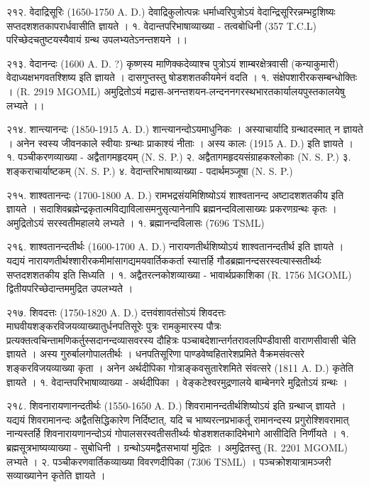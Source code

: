 २१२. वेदाद्रिसूरिः (1650-1750 A. D.)
देवाद्रिकुलोत्पन्नः धर्माध्वरिपुत्रोऽयं वेदान्द्रिसूरिरन्नम्भट्टशिष्यः सप्तदशशतकापरार्धवासीति ज्ञायते ।
१. वेदान्तपरिभाषाव्याख्या - तत्वबोधिनी (357 T.C.L) परिच्छेदचतुष्टयस्यैवायं ग्रन्थ उपलभ्यतेऽनन्तशयने ।।

२१३. वेदानन्दः (1600 A. D. ?)
कृष्णस्य माणिक्कदेव्याश्च पुत्रोऽयं शाम्बरक्षेत्रवासी (कन्याकुमारी) वेदाध्यक्षभगवतश्शिष्य इति ज्ञायते । दासगुप्तस्तु षोडशशतकीयमेनं वदति ।
१. संक्षेपशारीरकसम्बन्धोक्तिः । (R. 2919 MGOML)
अमुद्रितोऽयं मद्रास-अनन्तशयन-लन्दननगरस्थभारतकार्यालयपुस्तकालयेषु लभ्यते ।।

२१४. शान्त्यानन्दः (1850-1915 A. D.)
शान्त्यानन्दोऽयमाधुनिकः । अस्याचार्यादि ग्रन्थादस्मात् न ज्ञायते । अनेन स्वस्य जीवनकाले स्वीयाः ग्रन्थाः प्राकाश्यं नीताः । अस्य कालः (1915 A. D.) इति ज्ञायते ।
१. पञ्चीकरणव्याख्या - अद्वैतागमहृदयम् (N. S. P.)
२. अद्वैतागमहृदयसंग्राहकश्लोकाः (N. S. P.)
३. शङ्कराचार्याष्टकम् (N. S. P.)
४. वेदान्तरिभाषाव्याख्या - पदार्थमञ्जूषा (N. S. P.)

२१५. शाश्वतानन्दः (1700-1800 A. D.)
रामभद्रसंयमिशिष्योऽयं शाश्वतानन्द अष्टादशशतकीय इति ज्ञायते । सदाशिवब्रह्मेन्द्रकृतात्मविद्याविलासमनुसृत्यानेनापि ब्रह्मनन्दविलासाख्यः प्रकरणग्रन्थः कृतः । अमुद्रितोऽयं सरस्वतीमहालये लभ्यते ।
१. ब्रह्मानन्दविलासः (7696 TSML)

२१६. शाश्वतानन्दतीर्थः (1600-1700 A. D.)
नारायणतीर्थशिष्योऽयं शाश्वतानन्दतीर्थ इति ज्ञायते । यद्ययं नारायणतीर्थश्शारीरकमीमांसागद्यमयवार्तिककर्ता स्यात्तर्हि गौडब्रह्मानन्दसरस्वत्यास्सतीर्थ्यः सप्तदशशतकीय इति सिध्यति । 
१. अद्वैतरत्नकोशव्याख्या - भावार्थप्रकाशिका (R. 1756 MGOML) द्वितीयपरिच्छेदान्तममुद्रित उपलभ्यते ।

२१७. शिवदत्तः (1750-1820 A. D.)
दत्तवंशावतंसोऽयं शिवदत्तः माघवीयशङ्करविजयव्याख्यातुर्धनपतिसूरेः पुत्रः रामकुमारस्य पौत्रः प्रत्यक्तत्वचिन्तामणिकर्तुस्सदानन्दव्यासवरस्य दौहित्रः पञ्चाबदेशान्तर्गतरावलपिण्डीवासी वाराणसीवासी चेति ज्ञायते । अस्य गुरुर्बालगोपालतीर्थः । धनपतिसूरिणा पाण्डवेष्वहितारेशप्रमिते वैक्रमसंवत्सरे शङ्करविजयव्याख्या कृता । अनेन अर्थदीपिका गोत्राङ्कवसुतारेशमिते संवत्सरे (1811 A. D.) कृतेति ज्ञायते ।
१. वेदान्तपरिभाषाव्याख्या - अर्थदीपिका । वेङ्कटेश्वरमुद्रणालये बाम्बेनगरे मुद्रितोऽयं ग्रन्थः ।

२१८. शिवनारायणानन्दतीर्थः (1550-1650 A. D.)
शिवरामानन्दतीर्थशिष्योऽयं इति ग्रन्थाज् ज्ञायते । यद्ययं शिवरामानन्दः अद्वैतसिद्धिकारेण निर्दिष्टात्, यदि च भाष्यरत्नप्रभाकर्तू रामानन्दस्य प्रगुरोश्शिवरामात् नान्यस्तर्हि शिवनारायणानन्दोऽयं गोपालसरस्वतीसतीर्थ्यः षोडशशतकादिमेभागे आसीदिति निर्णीयते ।
१. ब्रह्मसूत्रभाष्यव्याख्या - सुबोधिनी । ग्रन्थोऽयमद्वैतसभायां मुद्रितः । अमुद्रितस्तु (R. 2201 MGOML) लभ्यते ।
२. पञ्चीकरणवार्तिकव्याख्या विवरणदीपिका (7306 TSML) । पञ्चक्रोशयात्रामञ्जरी सव्याख्यानेन कृतेति ज्ञायते ।

